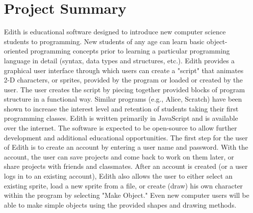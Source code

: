 \documentclass[a4paper]{article}
\begin{document}
\section{Project Summary}
Edith is educational software designed to introduce new computer science students to programming.  New students of any age can learn basic object-oriented programming concepts prior to learning a particular programming language in detail (syntax, data types and structures, etc.).  Edith provides a graphical user interface through which users can create a "script" that animates 2-D characters, or sprites, provided by the program or loaded or created by the user.  The user creates the script by piecing together provided blocks of program structure in a functional way.  Similar programs (e.g., Alice, Scratch) have been shown to increase the interest level and retention of students taking their first programming classes.  Edith is written primarily in JavaScript and is available over the internet.  The software is expected to be open-source to allow further development and additional educational opportunities.  \newline  \newline 
The first step for the user of Edith is to create an account by entering a user name and password.  With the account, the user can save projects and come back to work on them later, or share projects with friends and classmates.   After an account is created (or a user logs in to an existing account), Edith also allows the user to either select an existing sprite, load a new sprite from a file, or create (draw) his own character within the program by selecting "Make Object."  Even new computer users will be able to make simple objects using the provided shapes and drawing methods.         \newline  \newline 
\end{document}
